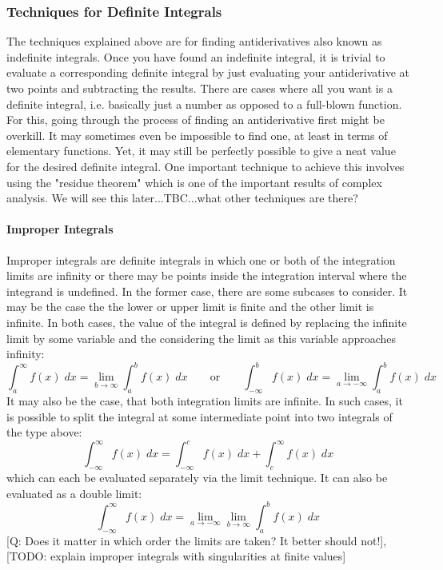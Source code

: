 
\subsubsection{Techniques for Definite Integrals}
The techniques explained above are for finding antiderivatives also known as indefinite integrals. Once you have found an indefinite integral, it is trivial to evaluate a corresponding definite integral by just evaluating your antiderivative at two points and subtracting the results. There are cases where all you want is a definite integral, i.e. basically just a number as opposed to a full-blown function. For this, going through the process of finding an antiderivative first might be overkill. It may sometimes even be impossible to find one, at least in terms of elementary functions. Yet, it may still be perfectly possible to give a neat value for the desired definite integral. One important technique to achieve this involves using the "residue theorem" which is one of the important results of complex analysis. We will see this later...TBC...what other techniques are there?


\paragraph{Improper Integrals}
Improper integrals are definite integrals in which one or both of the integration limits are infinity or there may be points inside the integration interval where the integrand is undefined. In the former case, there are some subcases to consider. It may be the case the the lower or upper limit is finite and the other limit is infinite. In both cases, the value of the integral is defined by replacing the infinite limit by some variable and the considering the limit as this variable approaches infinity:
\begin{equation}
\int_a^{\infty} f(x) \; dx = \lim_{b \rightarrow \infty} \int_a^b f(x) \; dx
\qquad \text{or} \qquad
\int_{-\infty}^b f(x) \; dx = \lim_{a \rightarrow -\infty} \int_a^b f(x) \; dx
\end{equation}
It may also be the case, that both integration limits are infinite. In such cases, it is possible to split the integral at some intermediate point into two integrals of the type above:
\begin{equation}
\int_{-\infty}^{\infty} f(x) \; dx = \int_{-\infty}^c f(x) \; dx + \int_c^{\infty} f(x) \; dx
\end{equation}
which can each be evaluated separately via the limit technique. It can also be evaluated as a double limit:
\begin{equation}
\int_{-\infty}^{\infty} f(x) \; dx = \lim_{a \rightarrow -\infty} \lim_{b \rightarrow \infty} \int_a^b f(x) \; dx
\end{equation}
[Q: Does it matter in which order the limits are taken? It better should not!], [TODO: explain improper integrals with singularities at finite values]


